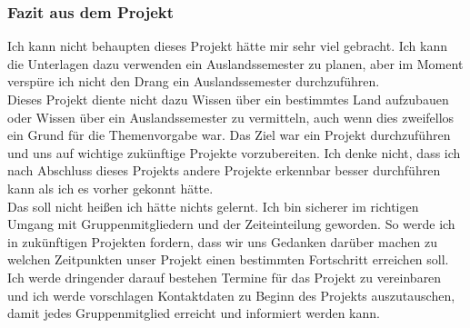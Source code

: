 \documentclass[11pt]{article}
\begin{document}
\subsubsection{Fazit aus dem Projekt}

Ich kann nicht behaupten dieses Projekt hätte mir sehr viel gebracht. Ich kann die Unterlagen dazu verwenden ein Auslandssemester zu planen, aber im Moment verspüre ich nicht den Drang ein Auslandssemester durchzuführen.  \\
Dieses Projekt diente nicht dazu Wissen über ein bestimmtes Land aufzubauen oder Wissen über ein Auslandssemester zu vermitteln, auch wenn dies zweifellos ein Grund für die Themenvorgabe war. Das Ziel war ein Projekt durchzuführen und uns auf wichtige zukünftige Projekte vorzubereiten. Ich denke nicht, dass ich nach Abschluss dieses Projekts andere Projekte erkennbar besser durchführen kann als ich es vorher gekonnt hätte.\\
Das soll nicht heißen ich hätte nichts gelernt. Ich bin sicherer im richtigen Umgang mit Gruppenmitgliedern und der Zeiteinteilung geworden. So werde ich in zukünftigen Projekten fordern, dass wir uns Gedanken darüber machen zu welchen Zeitpunkten unser Projekt einen bestimmten Fortschritt erreichen soll. Ich werde dringender darauf bestehen Termine für das Projekt zu vereinbaren und ich werde vorschlagen Kontaktdaten zu Beginn des Projekts auszutauschen, damit jedes Gruppenmitglied erreicht und informiert werden kann.

\newpage
\end{document}
